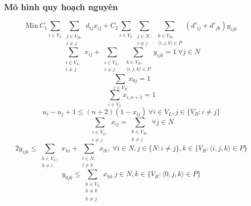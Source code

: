 \documentclass[a4paper,12pt]{report}
\begin{document}
\subsubsection{Mô hình quy hoạch nguyên} 
\begin{center}

\begin{equation} \label{eqn:1}
\text{Min}\  C_1 \sum_{i\in V_L} \sum_{\substack{j \in V_R,\\ i\neq j}}d_{ij}x_{ij}+C_2\sum_{i\in V_L} \sum_{\substack{j\in N,\\i \neq j }} \sum_{\substack{k \in V_R,\\ \langle i,j,k \rangle \in P}}(d'_{ij}+d'_{jk})y_{ijk}  
\end{equation}
\begin{equation}\label{eqn:2}
 \sum_{\substack{i \in V_L, \\i \neq j}}x_{ij}+\sum_{\substack{i \in V_L,\\i \neq j}}\sum_{\substack{k \in V_R,\\\langle i,j,k \rangle \in P}}y_{ijk}=1 \ \forall j \in N
\end{equation}
\begin{equation}\label{eqn:3}
\sum_{j \in V_R} x_{0j}=1
\end{equation}
\begin{equation}\label{eqn:4}
\sum_{i \in V_L}x_{i,n+1}=1
\end{equation}
\begin{equation}\label{eqn:5}
u_i-u_j+1 \leq (n+2)(1-x_{ij}) \ \forall i \in V_L, j \in \{V_R:i \neq j\}
\end{equation}
\begin{equation}\label{eqn:6}
\sum_{\substack{i \in V_L, \\ i \neq j}} x_{ij}=\sum_{\substack{k \in V_R,\\k \neq j}} \forall j \in N
\end{equation}
\begin{equation}\label{eqn:7}
2y_{ijk} \leq \sum_{\substack{h \in V_L, \\ h \neq i}} x_{hi} +\sum_{\substack{ l \in N,\\ l \neq k}} x_{lk}, \ \forall i \in N, j \in \{N:i \neq j\},k \in \{V_R:\langle i,j,k \rangle \in P\}
\end{equation}
\begin{equation}\label{eqn:8}
y_{0jk} \leq \sum_{\substack{h \in V_L \\ h \neq k\\ h \neq j}} x_{hk} \ j\in N,k \in \{V_R:\langle 0,j,k \rangle \in P\}

\end{equation}
\end{center}
\end{document}
